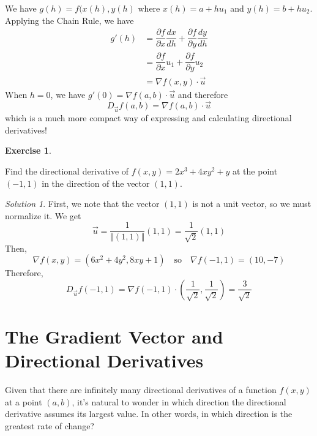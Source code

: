 \documentclass[
]{book}
\theoremstyle{definition}
\theoremstyle{definition}
\theoremstyle{definition}
\newtheorem{exercise}{Exercise}[chapter]
\theoremstyle{definition}
\theoremstyle{remark}
\newtheorem*{solution}{Solution}
\begin{document}
We have \(g(h)=f(x(h), y(h)\) where \(x(h)=a+hu_1\) and \(y(h)=b+hu_2\). Applying the Chain Rule, we have
\begin{align*}
g'(h) &= \dfrac{\partial f}{\partial x}\dfrac{dx}{dh}+\dfrac{\partial f}{\partial y}\dfrac{dy}{dh}\\
&= \dfrac{\partial f}{\partial x}u_1 + \dfrac{\partial f}{\partial y} u_2\\
&= \nabla f(x,y)\cdot\vec{u}
\end{align*}
When \(h=0\), we have \(g'(0)=\nabla f(a,b)\cdot\vec{u}\) and therefore \[D_{\vec{u}}f(a,b) = \nabla f(a,b)\cdot\vec{u}\]
which is a much more compact way of expressing and calculating directional derivatives!

\begin{exercise}
\protect\hypertarget{exr:unlabeled-div-49}{}\label{exr:unlabeled-div-49}

Find the directional derivative of \(f(x,y)=2x^3+4xy^2+y\) at the point \((-1,1)\) in the direction of the vector \((1,1)\).

\end{exercise}

\begin{solution}

First, we note that the vector \((1,1)\) is not a unit vector, so we must normalize it. We get \[\vec{u}=\dfrac{1}{\Vert (1,1)\Vert}(1,1)=\dfrac{1}{\sqrt{2}}(1,1)\]
Then, \[\nabla f(x,y) = (6x^2+4y^2, 8xy+1) \quad \mbox{so} \quad \nabla f (-1,1)=(10,-7)\]
Therefore, \[D_{\vec{u}}f(-1,1)=\nabla f(-1,1)\cdot\left (\dfrac{1}{\sqrt{2}}, \dfrac{1}{\sqrt{2}}\right ) = \dfrac{3}{\sqrt{2}}\]

\end{solution}

\hypertarget{the-gradient-vector-and-directional-derivatives}{%
\section{The Gradient Vector and Directional Derivatives}\label{the-gradient-vector-and-directional-derivatives}}

Given that there are infinitely many directional derivatives of a function \(f(x,y)\) at a point \((a,b)\), it's natural to wonder in which direction the directional derivative assumes its largest value. In other words, in which direction is the greatest rate of change?
\end{document}
